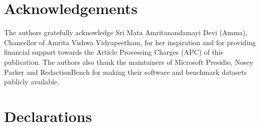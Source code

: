 \documentclass[pdflatex,sn-mathphys-num]{sn-jnl}
\theoremstyle{\ssThmStyle}
\theoremstyle{\ssDefStyle}
\begin{document}
\section*{Acknowledgements}
The authors gratefully acknowledge Sri Mata Amritanandamayi Devi (Amma), Chancellor of Amrita Vishwa Vidyapeetham, for her inspiration and for providing financial support towards the Article Processing Charges (APC) of this publication. The authors also thank the maintainers of Microsoft Presidio, Nosey Parker and RedactionBench for making their software and benchmark datasets publicly available.

\fi
\section*{Declarations}
\end{document}
